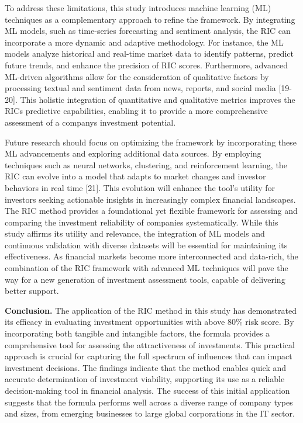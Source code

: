 \documentclass[
]{article}
\begin{document}
To address these limitations, this study introduces machine learning
(ML) techniques as a complementary approach to refine the framework. By
integrating ML models, such as time-series forecasting and sentiment
analysis, the RIC can incorporate a more dynamic and adaptive
methodology. For instance, the ML models analyze historical and
real-time market data to identify patterns, predict future trends, and
enhance the precision of RIC scores. Furthermore, advanced ML-driven
algorithms allow for the consideration of qualitative factors by
processing textual and sentiment data from news, reports, and social
media {[}19-20{]}. This holistic integration of quantitative and
qualitative metrics improves the RIC\textquotesingle s predictive
capabilities, enabling it to provide a more comprehensive assessment of
a company\textquotesingle s investment potential.

Future research should focus on optimizing the framework by
incorporating these ML advancements and exploring additional data
sources. By employing techniques such as neural networks, clustering,
and reinforcement learning, the RIC can evolve into a model that adapts
to market changes and investor behaviors in real time {[}21{]}. This
evolution will enhance the tool's utility for investors seeking
actionable insights in increasingly complex financial landscapes. The
RIC method provides a foundational yet flexible framework for assessing
and comparing the investment reliability of companies systematically.
While this study affirms its utility and relevance, the integration of
ML models and continuous validation with diverse datasets will be
essential for maintaining its effectiveness. As financial markets become
more interconnected and data-rich, the combination of the RIC framework
with advanced ML techniques will pave the way for a new generation of
investment assessment tools, capable of delivering better support.

\textbf{Conclusion.} The application of the RIC method in this study has
demonstrated its efficacy in evaluating investment opportunities with
above 80\% risk score. By incorporating both tangible and intangible
factors, the formula provides a comprehensive tool for assessing the
attractiveness of investments. This practical approach is crucial for
capturing the full spectrum of influences that can impact investment
decisions. The findings indicate that the method enables quick and
accurate determination of investment viability, supporting its use as a
reliable decision-making tool in financial analysis. The success of this
initial application suggests that the formula performs well across a
diverse range of company types and sizes, from emerging businesses to
large global corporations in the IT sector.
\end{document}
